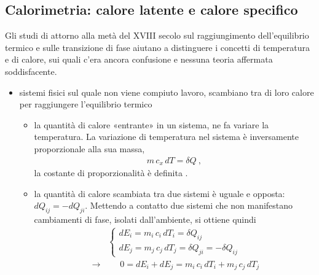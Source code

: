 \documentclass[letterpaper,10pt,italian]{jupyterBook}
\begin{document}
\subsection{Calorimetria: calore latente e calore specifico}
\label{\detokenize{ch/thermodynamics/foundation-experiments:calorimetria-calore-latente-e-calore-specifico}}
\sphinxAtStartPar
Gli studi di  attorno alla metà del XVIII secolo sul raggiungimento dell’equilibrio termico e sulle transizione di fase aiutano a distinguere i concetti di temperatura e di calore, sui quali c’era ancora confusione e nessuna teoria affermata soddisfacente.
\begin{itemize}
\item {} 
\sphinxAtStartPar
sistemi fisici sul quale non viene compiuto lavoro, scambiano tra di loro calore per raggiungere l’equilibrio termico
\begin{itemize}
\item {} 
\sphinxAtStartPar
la quantità di calore «entrante» in un sistema, ne fa variare la temperatura. La variazione di temperatura nel sistema è inversamente proporzionale alla sua massa,
\begin{equation*}
\begin{split}m \, c_x \, d T = \delta Q \ ,\end{split}
\end{equation*}
\sphinxAtStartPar
la costante di proporzionalità è definita .  

\item {} 
\sphinxAtStartPar
la quantità di calore scambiata tra due sistemi è uguale e opposta: \(d Q_{ij} = - d Q_{ji}\).
Mettendo a contatto due sistemi che non manifestano cambiamenti di fase, isolati dall’ambiente, si ottiene quindi
\begin{equation*}
\begin{split}\begin{cases}
      d E_i = m_i \, c_i \, d T_i = \delta Q_{ij} \\
      d E_j = m_j \, c_j \, d T_j = \delta Q_{ji} = - \delta Q_{ij}
    \end{cases}
    \end{split}
\end{equation*}\begin{equation*}
\begin{split}\rightarrow \qquad 0 = d E_i + d E_j = m_i \, c_i \, d T_i + m_j \, c_j \, d T_j\end{split}
\end{equation*}
\sphinxAtStartPar
{} 


\end{itemize}
\end{itemize}
\end{document}
